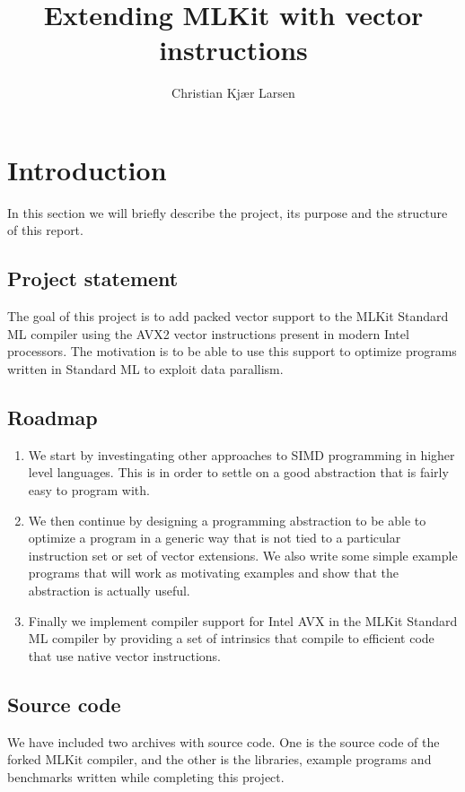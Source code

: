 \documentclass{article}
\title{Extending MLKit with vector instructions}
\author{Christian Kjær Larsen}
\begin{document}
\maketitle

\tableofcontents

\section{Introduction}

In this section we will briefly describe the project, its purpose and the structure of this report.

\subsection{Project statement}

The goal of this project is to add packed vector support to the MLKit\cite{mlkit} Standard ML compiler using the AVX2 vector instructions present in modern Intel processors. The motivation is to be able to use this support to optimize programs written in Standard ML to exploit data parallism.

\subsection{Roadmap}

\begin{enumerate}
    \item We start by investingating other approaches to SIMD programming in higher level languages. This is in order to settle on a
        good abstraction that is fairly easy to program with.
    \item
        We then continue by designing a programming abstraction to be able to optimize a program in a generic way that is not tied to a particular instruction set or set of vector extensions.
        We also write some simple example programs that will work as motivating examples and show that the abstraction is actually useful.
    \item
        Finally we implement compiler support for Intel AVX in the MLKit Standard ML compiler by providing a set of intrinsics that compile to efficient code that use native vector instructions.
\end{enumerate}

\subsection{Source code}
We have included two archives with source code. One is the source code of the forked MLKit compiler, and the other is the libraries, example programs and benchmarks written while completing this project.
\end{document}
